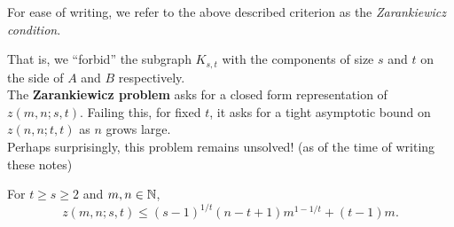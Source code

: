 \documentclass{article}
\begin{document}
		For ease of writing, we refer to the above described criterion as the \emph{Zarankiewicz condition}.

		That is, we ``forbid'' the subgraph $K_{s,t}$ with the components of size $s$ and $t$ on the side of $A$ and $B$ respectively.\\

		The \textbf{Zarankiewicz problem} asks for a closed form representation of $z(m,n;s,t)$. Failing this, for fixed $t$, it asks for a tight asymptotic bound on $z(n,n;t,t)$ as $n$ grows large.\\
		Perhaps surprisingly, this problem remains unsolved! (as of the time of writing these notes)

		\begin{ftheo}
			\label{theo: kovari sos turan}
			For $t\ge s\ge 2$ and $m,n\in\mathbb{N}$,
			$$z(m,n;s,t) \le (s-1)^{1/t} (n-t+1)m^{1-1/t} + (t-1)m.$$
		\end{ftheo}
\end{document}
